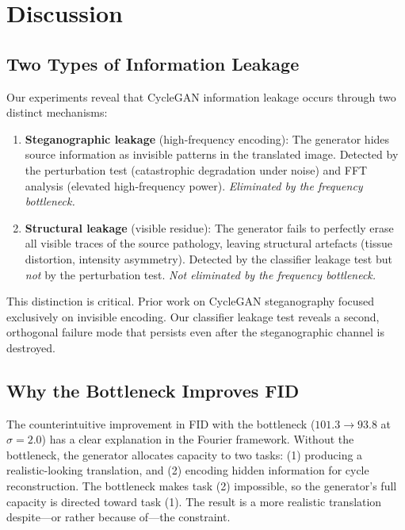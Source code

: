 \documentclass[11pt,a4paper]{article}
\theoremstyle{definition}
\begin{document}
\section{Discussion}

\subsection{Two Types of Information Leakage}

Our experiments reveal that CycleGAN information leakage occurs through two distinct mechanisms:

\begin{enumerate}
    \item \textbf{Steganographic leakage} (high-frequency encoding): The generator hides source information as invisible patterns in the translated image. Detected by the perturbation test (catastrophic degradation under noise) and FFT analysis (elevated high-frequency power). \emph{Eliminated by the frequency bottleneck.}

    \item \textbf{Structural leakage} (visible residue): The generator fails to perfectly erase all visible traces of the source pathology, leaving structural artefacts (tissue distortion, intensity asymmetry). Detected by the classifier leakage test but \emph{not} by the perturbation test. \emph{Not eliminated by the frequency bottleneck.}
\end{enumerate}

This distinction is critical. Prior work on CycleGAN steganography focused exclusively on invisible encoding. Our classifier leakage test reveals a second, orthogonal failure mode that persists even after the steganographic channel is destroyed.

\subsection{Why the Bottleneck Improves FID}

The counterintuitive improvement in FID with the bottleneck ($101.3 \to 93.8$ at $\sigma = 2.0$) has a clear explanation in the Fourier framework. Without the bottleneck, the generator allocates capacity to two tasks: (1) producing a realistic-looking translation, and (2) encoding hidden information for cycle reconstruction. The bottleneck makes task (2) impossible, so the generator's full capacity is directed toward task (1). The result is a more realistic translation despite---or rather because of---the constraint.
\end{document}
